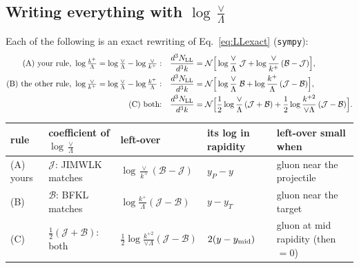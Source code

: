 \documentclass[10pt]{article}
\numberwithin{equation}{section}
\begin{document}
\subsection{Writing everything with $\log\frac{\vee}{\Lambda}$}
Each of the following is an exact rewriting of Eq.~\eqref{eq:LLexact} (\texttt{sympy}):
\begin{align}
\text{(A) your rule, }\log\tfrac{k^+}{\Lambda}=\log\tfrac{\vee}{\Lambda}-\log\tfrac{\vee}{k^+}:&\quad\frac{d^3N_{\rm LL}}{d^3k}=\mathcal N\Big[\log\frac{\vee}{\Lambda}\;\mathcal J+\log\frac{\vee}{k^+}\,(\mathcal B-\mathcal J)\Big],\label{eq:A}\\
\text{(B) the other rule, }\log\tfrac{\vee}{k^+}=\log\tfrac{\vee}{\Lambda}-\log\tfrac{k^+}{\Lambda}:&\quad\frac{d^3N_{\rm LL}}{d^3k}=\mathcal N\Big[\log\frac{\vee}{\Lambda}\;\mathcal B+\log\frac{k^+}{\Lambda}\,(\mathcal J-\mathcal B)\Big],\label{eq:B}\\
\text{(C) both:}&\quad\frac{d^3N_{\rm LL}}{d^3k}=\mathcal N\Big[\frac12\log\frac{\vee}{\Lambda}\,(\mathcal J+\mathcal B)+\frac12\log\frac{k^{+2}}{\vee\Lambda}\,(\mathcal J-\mathcal B)\Big].\label{eq:C}
\end{align}
\begin{table}[H]\centering\small
\begin{tabular}{@{}lllll@{}}\toprule
rule & coefficient of $\log\frac{\vee}{\Lambda}$ & left-over & its log in rapidity & left-over small when\\\midrule
(A) yours & $\mathcal J$: JIMWLK matches & $\log\frac{\vee}{k^+}(\mathcal B-\mathcal J)$ & $y_P-y$ & gluon near the projectile\\
(B) & $\mathcal B$: BFKL matches & $\log\frac{k^+}{\Lambda}(\mathcal J-\mathcal B)$ & $y-y_T$ & gluon near the target\\
(C) & $\frac12(\mathcal J+\mathcal B)$: both & $\frac12\log\frac{k^{+2}}{\vee\Lambda}(\mathcal J-\mathcal B)$ & $2(y-y_{\rm mid})$ & gluon at mid rapidity (then $=0$)\\\bottomrule
\end{tabular}
\end{table}
\end{document}
